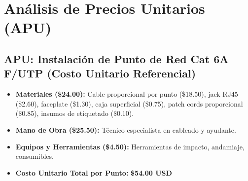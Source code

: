 \begin{table}[H]
\centering
\caption{Partidas de Ingeniería de Detalle, Planos Técnicos y Documentación}
%
\end{table}

\clearpage

\section{Análisis de Precios Unitarios (APU)}

\subsection*{APU: Instalación de Punto de Red Cat 6A F/UTP (Costo Unitario Referencial)}

\begin{itemize}
    \item \textbf{Materiales (\$24.00):} Cable proporcional por punto (\$18.50), jack RJ45 (\$2.60), faceplate (\$1.30), caja superficial (\$0.75), patch cords proporcional (\$0.85), insumos de etiquetado (\$0.10).
    \item \textbf{Mano de Obra (\$25.50):} Técnico especialista en cableado y ayudante.
    \item \textbf{Equipos y Herramientas (\$4.50):} Herramientas de impacto, andamiaje, consumibles.
    \item \textbf{Costo Unitario Total por Punto:} \textbf{\$54.00 USD}
\end{itemize}

